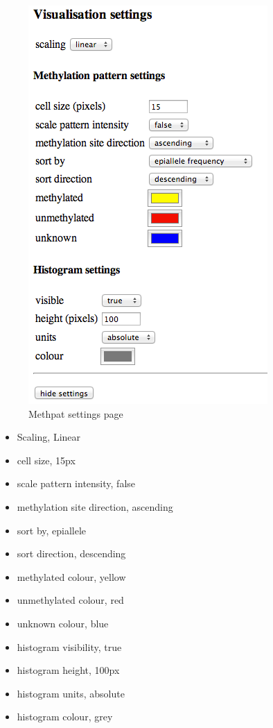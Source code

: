 \documentclass[11pt,a4paper]{article}
\begin{document}
\begin{figure}[H] %
   \centering
   \includegraphics[scale=0.65]{methpat002.png} 
   \caption{Methpat settings page}
   \label{fig:methpat2}
\end{figure}

\begin{itemize}
\item{Scaling, Linear}
\item{cell size, 15px}
\item{scale pattern intensity, false}
\item{methylation site direction, ascending}
\item{sort by, epiallele}
\item{sort direction, descending}
\item{methylated colour, yellow}
\item{unmethylated colour, red}
\item{unknown colour, blue}
\item{histogram visibility, true}
\item{histogram height, 100px}
\item{histogram units, absolute}
\item{histogram colour, grey}
\end{itemize}
\end{document}
